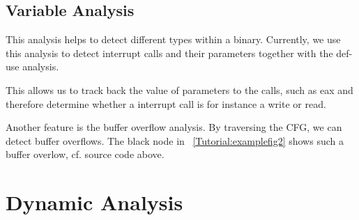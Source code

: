 \subsection{Variable Analysis}

This analysis helps to detect different types within a binary.
Currently, we use this analysis to detect interrupt calls and their parameters together with the def-use analysis.

This allows us to track back the value of parameters to the calls, such as eax and therefore 
determine whether a interrupt call is for instance a write or read.

Another feature is the buffer overflow analysis. By traversing the CFG, we can detect buffer overflows.
The black node in ~\ref{Tutorial:examplefig2} shows such a buffer overlow, cf. source code
above.


\section{Dynamic Analysis}

